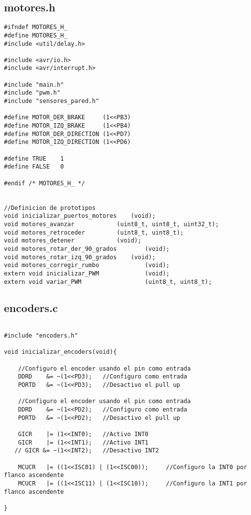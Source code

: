 \documentclass[a4paper,12pt]{article}   %
\begin{document}
\subsection{motores.h}
\begin{lstlisting}
#ifndef MOTORES_H_
#define MOTORES_H_
#include <util/delay.h>

#include <avr/io.h>
#include <avr/interrupt.h>

#include "main.h"
#include "pwm.h"
#include "sensores_pared.h"

#define MOTOR_DER_BRAKE		(1<<PB3)
#define MOTOR_IZQ_BRAKE		(1<<PB4)
#define MOTOR_DER_DIRECTION	(1<<PD7)
#define MOTOR_IZQ_DIRECTION	(1<<PD6)

#define TRUE    1
#define FALSE   0

#endif /* MOTORES_H_ */


//Definicion de prototipos
void inicializar_puertos_motores	(void);
void motores_avanzar			(uint8_t, uint8_t, uint32_t);
void motores_retroceder			(uint8_t, uint8_t);
void motores_detener			(void);
void motores_rotar_der_90_grados    	(void);
void motores_rotar_izq_90_grados	(void);
void motores_corregir_rumbo         	(void);
extern void inicializar_PWM         	(void);
extern void variar_PWM              	(uint8_t, uint8_t);
\end{lstlisting}

\subsection{encoders.c}
\begin{lstlisting}

#include "encoders.h"

void inicializar_encoders(void){

    //Configuro el encoder usando el pin como entrada
    DDRD    &= ~(1<<PD3);   //Configuro como entrada
    PORTD   &= ~(1<<PD3);   //Desactivo el pull up

    //Configuro el encoder usando el pin como entrada
    DDRD    &= ~(1<<PD2);   //Configuro como entrada
    PORTD   &= ~(1<<PD2);   //Desactivo el pull up

    GICR    |= (1<<INT0);   //Activo INT0
    GICR    |= (1<<INT1);   //Activo INT1
   // GICR &= ~(1<<INT2);   //Desactivo INT2

    MCUCR   |= ((1<<ISC01) | (1<<ISC00));     //Configuro la INT0 por flanco ascendente
    MCUCR   |= ((1<<ISC11) | (1<<ISC10));     //Configuro la INT1 por flanco ascendente

}

\end{lstlisting}
\end{document}
